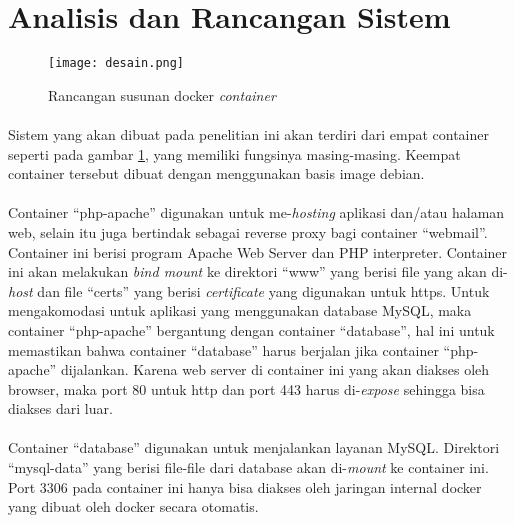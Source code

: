 \documentclass[./bab_3.tex]{subfiles}
\begin{document}
\section{Analisis dan Rancangan Sistem}
\begin{figure}[ht!]
  \begin{center}
    \texttt{[image: desain.png]}
  \end{center}
  \caption{Rancangan susunan docker \textit{container}}
  \label{rancangan}
\end{figure}

\paragraph*{}Sistem yang akan dibuat pada penelitian ini
akan terdiri dari empat container seperti pada gambar
\ref{rancangan}, yang memiliki fungsinya masing-masing.
Keempat container tersebut dibuat dengan menggunakan basis
image debian.

\paragraph*{}Container ``php-apache'' digunakan untuk
me-\textit{hosting} aplikasi dan/atau halaman web, selain
itu juga bertindak sebagai reverse proxy bagi container
``webmail''. Container ini berisi program Apache Web Server dan
PHP interpreter. Container ini akan melakukan \textit{bind
mount} ke direktori ``www'' yang berisi file yang akan
di-\textit{host} dan file ``certs'' yang berisi
\textit{certificate} yang digunakan untuk https. Untuk
mengakomodasi untuk aplikasi yang menggunakan database
MySQL, maka container ``php-apache'' bergantung dengan
container ``database'', hal ini untuk memastikan bahwa
container ``database'' harus berjalan jika container
``php-apache'' dijalankan. Karena web server di container ini
yang akan diakses oleh browser, maka port 80 untuk http dan
port 443 harus di-\textit{expose} sehingga bisa diakses dari
luar. 

\paragraph*{}Container ``database'' digunakan untuk menjalankan
layanan MySQL. Direktori ``mysql-data'' yang berisi file-file
dari database akan di-\textit{mount} ke container ini. Port
3306 pada container ini hanya bisa diakses oleh jaringan
internal docker yang dibuat oleh docker secara otomatis.
\end{document}
